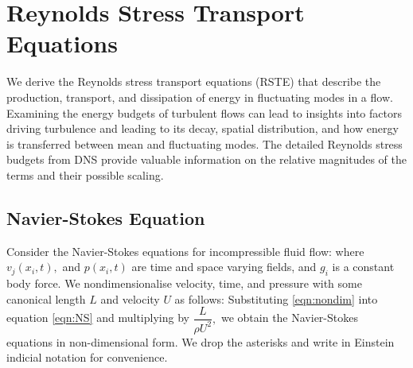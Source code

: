 \chapter{Reynolds Stress Transport Equations}
\label{chap:rste}
We derive the Reynolds stress transport equations (RSTE) that describe the production, transport, and dissipation of energy in fluctuating modes in a flow. Examining the energy budgets of turbulent flows can lead to insights into factors driving turbulence and leading to its decay, spatial distribution, and how energy is transferred between mean and fluctuating modes. The detailed Reynolds stress budgets from DNS provide valuable information on the relative magnitudes of the terms and their possible scaling.

\section{Navier-Stokes Equation}
Consider the Navier-Stokes equations for incompressible fluid flow:
where $v_j(x_i,t),$ and $p(x_i,t)$ are time and space varying fields, and $g_i$ is a constant body force. We nondimensionalise velocity, time, and pressure with some canonical length $L$ and velocity $U$ as follows:
Substituting \autoref{eqn:nondim} into equation \autoref{eqn:NS} and multiplying by $\dfrac{L}{\rho U^2},$ we obtain the Navier-Stokes equations in non-dimensional form.
We drop the asterisks and write in Einstein indicial notation for convenience.
